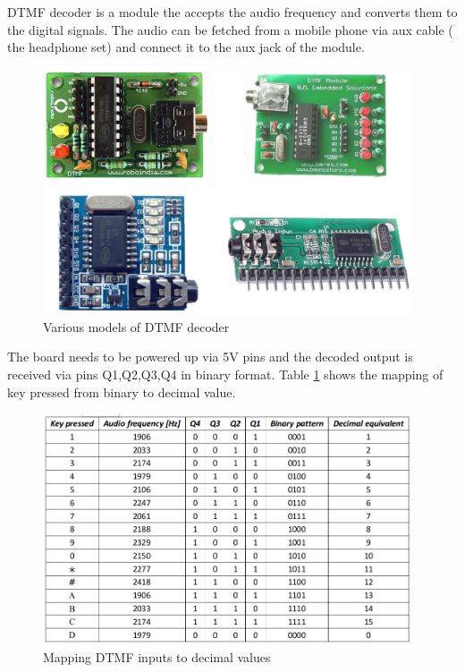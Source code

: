 \ac{DTMF} decoder is a module the accepts the audio frequency and converts them to the digital signals. The audio can be fetched from a mobile phone via aux cable ( the headphone set) and connect it to the aux jack of the module. 

\begin{figure}
    \centering
    \includegraphics[width=4.3in]{Images/DTMF/DTMF_series.png}
    \caption[MT8870 DTMF decoder]{Various models of \ac{DTMF} decoder}
\end{figure}

\par The board needs to be powered up via 5V pins and the decoded output is received via pins Q1,Q2,Q3,Q4 in binary format. Table \ref{fig:dtmf_map} shows the mapping of key pressed from binary to decimal value.
\begin{figure}
    \centering
    \includegraphics[width=4.3in]{Tables/DTMF/dtmf_pattern.png}
    \caption[DTMF pattern]{Mapping \ac{DTMF} inputs to decimal values}
    \label{fig:dtmf_map}
\end{figure}

